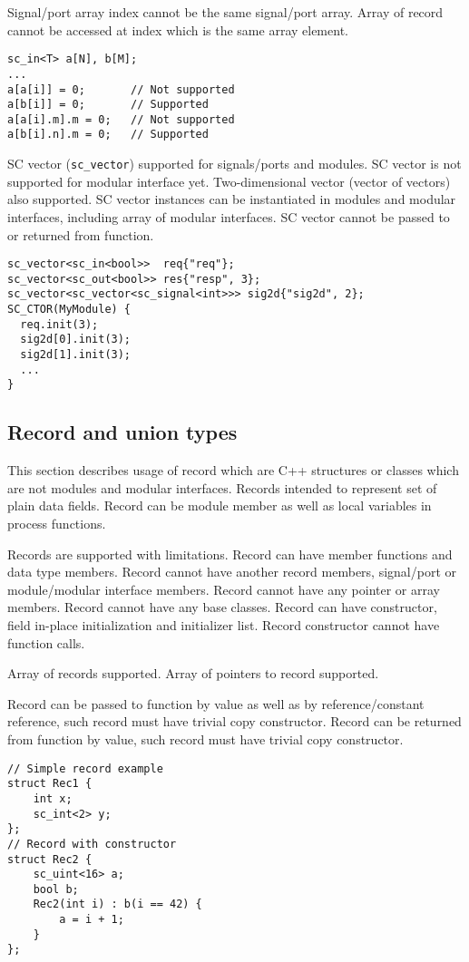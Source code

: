 Signal/port array index cannot be the same signal/port array. Array of record cannot be accessed at index which is the same array element.
%
\begin{lstlisting}[style=mycpp]
sc_in<T> a[N], b[M]; 
...
a[a[i]] = 0;       // Not supported 
a[b[i]] = 0;       // Supported
a[a[i].m].m = 0;   // Not supported 
a[b[i].n].m = 0;   // Supported
\end{lstlisting}

SC vector ({\tt sc\_vector}) supported for signals/ports and modules. SC vector is not supported for modular interface yet. Two-dimensional vector (vector of vectors) also supported. SC vector instances can be instantiated in modules and modular interfaces, including array of modular interfaces. SC vector cannot be passed to or returned from function.
%
\begin{lstlisting}[style=mycpp]
sc_vector<sc_in<bool>>  req{"req"};
sc_vector<sc_out<bool>> res{"resp", 3};
sc_vector<sc_vector<sc_signal<int>>> sig2d{"sig2d", 2};
SC_CTOR(MyModule) {
  req.init(3);
  sig2d[0].init(3);
  sig2d[1].init(3);        
  ...
}
\end{lstlisting}



\subsection{Record and union types}

This section describes usage of record which are C++ structures or classes which are not modules and modular interfaces. Records intended to represent set of plain data fields. Record can be module member as well as local variables in process functions. 

Records are supported with limitations. Record can have member functions and data type members. Record cannot have another record members, signal/port or module/modular interface members. Record cannot have any pointer or array members. Record cannot have any base classes.
Record can have constructor, field in-place initialization and initializer list. Record constructor cannot have function calls.

Array of records supported. Array of pointers to record supported.

Record can be passed to function by value as well as by reference/constant reference, such record must have trivial copy constructor. Record can be returned from function by value, such record must have trivial copy constructor.
%
\begin{lstlisting}[style=mycpp]
// Simple record example
struct Rec1 {
    int x;
    sc_int<2> y;
};
// Record with constructor
struct Rec2 {
    sc_uint<16> a;       
    bool b;
    Rec2(int i) : b(i == 42) {
        a = i + 1;
    }
};
\end{lstlisting}


